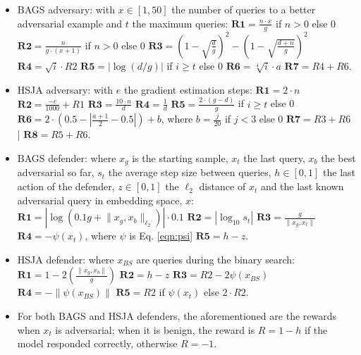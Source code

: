 \begin{itemize}[leftmargin=*]
    \setlength\itemsep{0.5em}
    \item BAGS adversary: with $x \in [1,50]$ the number of queries to a better adversarial example and $t$ the maximum queries: $\textbf{R1} = \frac{n\cdot x}{g} $ if $n > 0$ else 0 \text{\textbar} $\textbf{R2} = \frac{n}{g\cdot(x+1)} $ if $n > 0$ else 0 \text{\textbar} $\textbf{R3} = (1-\sqrt{\frac{d}{g}})^2 - (1-\sqrt{\frac{d+n}{g}})^2$ \text{\textbar} $\textbf{R4} = \sqrt{i} \cdot R2$ \text{\textbar} $\textbf{R5} = |\log(d/g)|$ if $i\geq t$ else 0 \text{\textbar} $\textbf{R6} = \sqrt[4]{i} \cdot a$ \text{\textbar} $\textbf{R7} = R4 + R6$.
    \item HSJA adversary: with $e$ the gradient estimation steps: $\textbf{R1} = 2 \cdot n$ \text{\textbar} $\textbf{R2} = \frac{-e}{1000} + R1$ \text{\textbar} $\textbf{R3} = \frac{10\cdot n}{d} $ \text{\textbar} $\textbf{R4} = \frac{1}{d}$ \text{\textbar} $\textbf{R5} = \frac{2\cdot (g - d)}{g}$ if $i\geq t$ else 0 \text{\textbar} $\textbf{R6} = 2\cdot (0.5 - |\frac{a+1}{2} - 0.5|) + b$, where $b = \frac{j}{20}$ if $j<3$ else 0 \text{\textbar} $\textbf{R7} = R3 + R6$ | $\textbf{R8} = R5 + R6$.
    \item BAGS defender: where $x_g$ is the starting sample, $x_t$ the last query, $x_b$ the best adversarial so far, $s_t$ the average step size between queries, $h \in [0,1]$ the last action of the defender, $z \in [0,1]$ the $\ell_2$ distance of $x_t$ and the last known adversarial query in embedding space, $x$: $\textbf{R1} = |\log(0.1 g + \lVert x_g, x_b \rVert _{\ell_2})| \cdot 0.1$ \text{\textbar} $\textbf{R2} = |\log_{10}s_t| $ \text{\textbar} $\textbf{R3} = \frac{g}{\lVert x_g, x_t \rVert}$ \text{\textbar} $\textbf{R4} = - \psi (x_t)$, where $\psi$ is Eq. \ref{eqn:psi} \text{\textbar} $\textbf{R5} = h - z$.
    \item HSJA defender: where $x_{BS}$ are queries during the binary search: $\textbf{R1} = 1 - 2(\frac{\lVert x_g, x_b \rVert}{g})$ \text{\textbar} $\textbf{R2} = h - z$ \text{\textbar} $\textbf{R3} = R2 - 2\psi (x_{BS})$ \text{\textbar} $\textbf{R4} = - \lVert \psi(x_{BS}) \rVert$ \text{\textbar} $\textbf{R5} = R2$ if $\psi(x_t)$ else $2\cdot R2$.
    \item For both BAGS and HSJA defenders, the aforementioned are the rewards when $x_t$ is adversarial; when it is benign, the reward is $R = 1 - h$ if the model responded correctly, otherwise $R = -1$.
\end{itemize}

